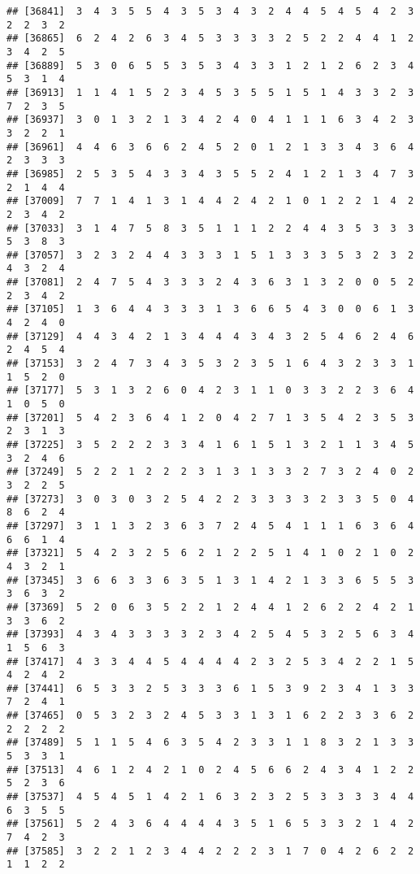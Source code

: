\documentclass[
]{article}
\begin{document}
\begin{verbatim}
## [36841]  3  4  3  5  5  4  3  5  3  4  3  2  4  4  5  4  5  4  2  3  2  2  3  2
## [36865]  6  2  4  2  6  3  4  5  3  3  3  3  2  5  2  2  4  4  1  2  3  4  2  5
## [36889]  5  3  0  6  5  5  3  5  3  4  3  3  1  2  1  2  6  2  3  4  5  3  1  4
## [36913]  1  1  4  1  5  2  3  4  5  3  5  5  1  5  1  4  3  3  2  3  7  2  3  5
## [36937]  3  0  1  3  2  1  3  4  2  4  0  4  1  1  1  6  3  4  2  3  3  2  2  1
## [36961]  4  4  6  3  6  6  2  4  5  2  0  1  2  1  3  3  4  3  6  4  2  3  3  3
## [36985]  2  5  3  5  4  3  3  4  3  5  5  2  4  1  2  1  3  4  7  3  2  1  4  4
## [37009]  7  7  1  4  1  3  1  4  4  2  4  2  1  0  1  2  2  1  4  2  2  3  4  2
## [37033]  3  1  4  7  5  8  3  5  1  1  1  2  2  4  4  3  5  3  3  3  5  3  8  3
## [37057]  3  2  3  2  4  4  3  3  3  1  5  1  3  3  3  5  3  2  3  2  4  3  2  4
## [37081]  2  4  7  5  4  3  3  3  2  4  3  6  3  1  3  2  0  0  5  2  2  3  4  2
## [37105]  1  3  6  4  4  3  3  3  1  3  6  6  5  4  3  0  0  6  1  3  4  2  4  0
## [37129]  4  4  3  4  2  1  3  4  4  4  3  4  3  2  5  4  6  2  4  6  2  4  5  4
## [37153]  3  2  4  7  3  4  3  5  3  2  3  5  1  6  4  3  2  3  3  1  1  5  2  0
## [37177]  5  3  1  3  2  6  0  4  2  3  1  1  0  3  3  2  2  3  6  4  1  0  5  0
## [37201]  5  4  2  3  6  4  1  2  0  4  2  7  1  3  5  4  2  3  5  3  2  3  1  3
## [37225]  3  5  2  2  2  3  3  4  1  6  1  5  1  3  2  1  1  3  4  5  3  2  4  6
## [37249]  5  2  2  1  2  2  2  3  1  3  1  3  3  2  7  3  2  4  0  2  3  2  2  5
## [37273]  3  0  3  0  3  2  5  4  2  2  3  3  3  3  2  3  3  5  0  4  8  6  2  4
## [37297]  3  1  1  3  2  3  6  3  7  2  4  5  4  1  1  1  6  3  6  4  6  6  1  4
## [37321]  5  4  2  3  2  5  6  2  1  2  2  5  1  4  1  0  2  1  0  2  4  3  2  1
## [37345]  3  6  6  3  3  6  3  5  1  3  1  4  2  1  3  3  6  5  5  3  3  6  3  2
## [37369]  5  2  0  6  3  5  2  2  1  2  4  4  1  2  6  2  2  4  2  1  3  3  6  2
## [37393]  4  3  4  3  3  3  3  2  3  4  2  5  4  5  3  2  5  6  3  4  1  5  6  3
## [37417]  4  3  3  4  4  5  4  4  4  4  2  3  2  5  3  4  2  2  1  5  4  2  4  2
## [37441]  6  5  3  3  2  5  3  3  3  6  1  5  3  9  2  3  4  1  3  3  7  2  4  1
## [37465]  0  5  3  2  3  2  4  5  3  3  1  3  1  6  2  2  3  3  6  2  2  2  2  2
## [37489]  5  1  1  5  4  6  3  5  4  2  3  3  1  1  8  3  2  1  3  3  5  3  3  1
## [37513]  4  6  1  2  4  2  1  0  2  4  5  6  6  2  4  3  4  1  2  2  5  2  3  6
## [37537]  4  5  4  5  1  4  2  1  6  3  2  3  2  5  3  3  3  3  4  4  6  3  5  5
## [37561]  5  2  4  3  6  4  4  4  4  3  5  1  6  5  3  3  2  1  4  2  7  4  2  3
## [37585]  3  2  2  1  2  3  4  4  2  2  2  3  1  7  0  4  2  6  2  2  1  1  2  2

\end{verbatim}
\end{document}
